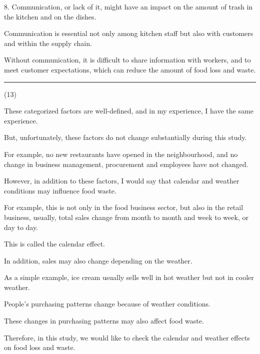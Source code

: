 \documentclass{article}
\begin{document}
\begin{multicols}{2}
\begin{spacing}{1.1}
8. Communication, or lack of it, might have an impact on the amount of trash in the kitchen and on the dishes.

Communication is essential not only among kitchen staff but also with customers and within the supply chain.

Without communication, 
it is difficult to share information with workers, and to meet customer expectations,
which can reduce the amount of food loss and waste.


\noindent\rule{0.1\textwidth}{1pt}\small(13)

These categorized factors are well-defined, 
and in my experience, I have the same experience.

But, unfortunately, these factors do not change substantially during this study.

For example, 
no new restaurants have opened in the neighbourhood, 
and no change in business management, procurement and employees have not changed.

\vspace{1em}

However, in addition to these factors, 
I would say that calendar and weather conditions may influence food waste.

For example, 
this is not only in the food business sector, 
but also in the retail business, 
usually, total sales change from month to month and week to week, or day to day. 

This is called the calendar effect.

\vspace{1em}

In addition, 
sales may also change depending on the weather.

As a simple example, 
ice cream usually sells well in hot weather but not in cooler weather.

People's purchasing patterns change because of weather conditions. 

These changes in purchasing patterns may also affect food waste.

\vspace{1em}

Therefore, in this study, we would like to check the calendar and weather effects on food loss and waste.


\end{spacing}
\end{multicols}
\end{document}
